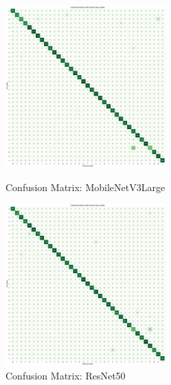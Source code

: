 \begin{figure}[h!]
    \centering
    \includegraphics[width=0.55\textwidth]{Assets/confusion_matrix/MobileNetV3Large.png}
    \caption{Confusion Matrix: MobileNetV3Large}
    \vspace{1.5cm}
    \includegraphics[width=0.55\textwidth]{Assets/confusion_matrix/ResNet50.png}
    \caption{Confusion Matrix: ResNet50}
\end{figure}

\newpage

